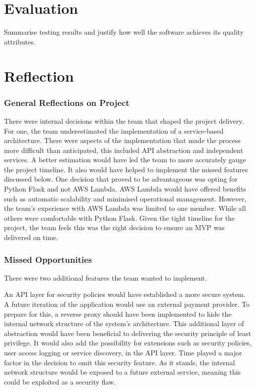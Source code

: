 \documentclass{article}
\begin{document}
\section{Evaluation}
Summarise testing results and justify how well the software achieves its quality attributes.
\section{Reflection}
\subsubsection*{General Reflections on Project}

There were internal decisions within the team that shaped the project delivery. For one, the team underestimated the implementation of a service-based architecture. There were aspects of the implementation that made the process more difficult than anticipated, this included API abstraction and independent services. A better estimation would have led the team to more accurately gauge the project timeline. It also would have helped to implement the missed features discussed below. One decision that proved to be advantageous was opting for Python Flask and not AWS Lambda. AWS Lambda would have offered benefits such as automatic scalability and minimised operational management. However, the team's experience with AWS Lambda was limited to one member. While all others were comfortable with Python Flask. Given the tight timeline for the project, the team feels this was the right decision to ensure an MVP was delivered on time. 

\subsubsection*{Missed Opportunities}
There were two additional features the team wanted to implement.

\medskip \noindent An API layer for security policies would have established a more secure system. A future iteration of the application would use an external payment provider. To prepare for this, a reverse proxy should have been implemented to hide the internal network structure of the system's architecture. This additional layer of abstraction would have been beneficial to delivering the security principle of least privilege. It would also add the possibility for extensions such as security policies, user access logging or service discovery, in the API layer. Time played a major factor in the decision to omit this security feature. As it stands, the internal network structure would be exposed to a future external service, meaning this could be exploited as a security flaw. 
\end{document}
